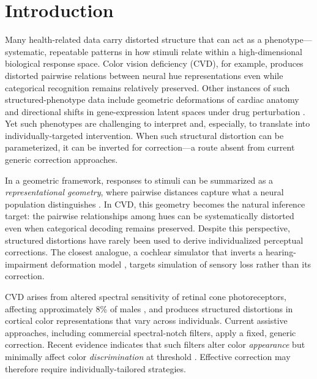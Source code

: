 \documentclass{article}
\begin{document}
\section{Introduction}
\label{sec:intro}

Many health-related data carry distorted structure that can act as a phenotype—systematic, repeatable patterns in how stimuli relate within a high-dimensional biological response space.
Color vision deficiency (CVD), for example, produces distorted pairwise relations between neural hue representations even while categorical recognition remains relatively preserved.
Other instances of such structured-phenotype data include geometric deformations of cardiac anatomy \citep{biffi2020} and directional shifts in gene-expression latent spaces under drug perturbation \citep{lotfollahi2019}.
Yet such phenotypes are challenging to interpret and, especially, to translate into individually-targeted intervention.
When such structural distortion can be parameterized, it can be inverted for correction—a route absent from current generic correction approaches.

In a geometric framework, responses to stimuli can be summarized as a \emph{representational geometry}, where pairwise distances capture what a neural population distinguishes \citep{kriegeskorte2008}.
In CVD, this geometry becomes the natural inference target: the pairwise relationships among hues can be systematically distorted even when categorical decoding remains preserved.
Despite this perspective, structured distortions have rarely been used to derive individualized perceptual corrections.
The closest analogue, a cochlear simulator that inverts a hearing-impairment deformation model \citep{irino2023}, targets simulation of sensory loss rather than its correction.

CVD arises from altered spectral sensitivity of retinal cone photoreceptors, affecting approximately 8\% of males \citep{machado2009}, and produces structured distortions in cortical color representations that vary across individuals.
Current assistive approaches, including commercial spectral-notch filters, apply a fixed, generic correction.
Recent evidence indicates that such filters alter color \emph{appearance} but minimally affect color \emph{discrimination} at threshold \citep{somers2024}.
Effective correction may therefore require individually-tailored strategies.
\end{document}
